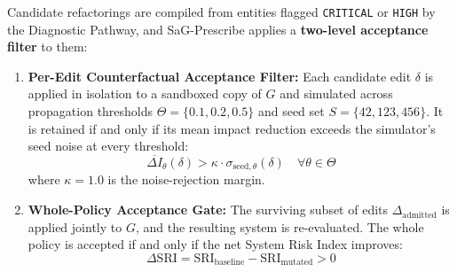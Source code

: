 Candidate refactorings are compiled from entities flagged \texttt{CRITICAL} or \texttt{HIGH} by the Diagnostic Pathway, and SaG-Prescribe applies a \textbf{two-level acceptance filter} to them:
\begin{enumerate}
    \item \textbf{Per-Edit Counterfactual Acceptance Filter:} Each candidate edit $\delta$ is applied in isolation to a sandboxed copy of $G$ and simulated across propagation thresholds $\Theta = \{0.1, 0.2, 0.5\}$ and seed set $S = \{42, 123, 456\}$. It is retained if and only if its mean impact reduction exceeds the simulator's seed noise at every threshold:
    \begin{equation}
    \overline{\Delta I}_\theta(\delta) > \kappa \cdot \sigma_{\text{seed},\theta}(\delta) \quad \forall \theta \in \Theta
    \end{equation}
    where $\kappa = 1.0$ is the noise-rejection margin.
    \item \textbf{Whole-Policy Acceptance Gate:} The surviving subset of edits $\Delta_{\text{admitted}}$ is applied jointly to $G$, and the resulting system is re-evaluated. The whole policy is accepted if and only if the net System Risk Index improves:
    \begin{equation}
    \Delta\mathrm{SRI} = \mathrm{SRI}_{\text{baseline}} - \mathrm{SRI}_{\text{mutated}} > 0
    \end{equation}
\end{enumerate}
